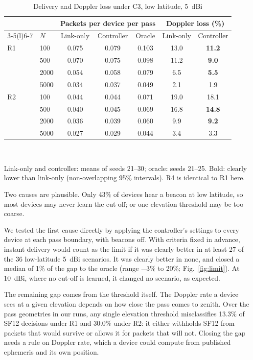 \documentclass[journal]{IEEEtran}
\begin{document}
\begin{table}[t]
\centering
\caption{Delivery and Doppler loss under C3, low latitude, 5~dBi}\label{tab:c3}
\setlength{\tabcolsep}{4pt}
\begin{tabular}{@{}llccccc@{}}
\toprule
 & & \multicolumn{3}{c}{Packets per device per pass} & \multicolumn{2}{c}{Doppler loss (\%)} \\
\cmidrule(lr){3-5}\cmidrule(l){6-7}
 & $N$ & Link-only & Controller & Oracle & Link-only & Controller \\
\midrule
R1 & 100  & 0.075 & 0.079 & 0.103 & 13.0 & \textbf{11.2} \\
   & 500  & 0.070 & 0.075 & 0.098 & 11.2 & \textbf{9.0} \\
   & 2000 & 0.054 & 0.058 & 0.079 & 6.5 & \textbf{5.5} \\
   & 5000 & 0.034 & 0.037 & 0.049 & 2.1 & 1.9 \\
\midrule
R2 & 100  & 0.044 & 0.044 & 0.071 & 19.0 & 18.1 \\
   & 500  & 0.040 & 0.045 & 0.069 & 16.8 & \textbf{14.8} \\
   & 2000 & 0.036 & 0.039 & 0.060 & 9.9 & \textbf{9.2} \\
   & 5000 & 0.027 & 0.029 & 0.044 & 3.4 & 3.3 \\
\bottomrule
\end{tabular}
\\[2pt]
\parbox{\linewidth}{\footnotesize Link-only and controller: means of seeds 21--30; oracle: seeds 21--25. Bold: clearly lower than link-only (non-overlapping 95\% intervals). R4 is identical to R1 here.}
\end{table} Two causes are plausible. Only 43\% of devices hear a beacon at low latitude, so most devices may never learn the cut-off; or one elevation threshold may be too coarse.

We tested the first cause directly by applying the controller's settings to every device at each pass boundary, with beacons off. With criteria fixed in advance, instant delivery would count as the limit if it was clearly better in at least 27 of the 36 low-latitude 5~dBi scenarios. It was clearly better in none, and closed a median of 1\% of the gap to the oracle (range $-3\%$ to 20\%; Fig.~\ref{fig:limit}). At 10~dBi, where no cut-off is learned, it changed no scenario, as expected.

The remaining gap comes from the threshold itself. The Doppler rate a device sees at a given elevation depends on how close the pass comes to zenith. Over the pass geometries in our runs, any single elevation threshold misclassifies 13.3\% of SF12 decisions under R1 and 30.0\% under R2: it either withholds SF12 from packets that would survive or allows it for packets that will not. Closing the gap needs a rule on Doppler rate, which a device could compute from published ephemeris and its own position.
\end{document}

